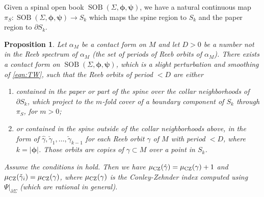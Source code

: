 \documentclass[11pt]{amsart}
\numberwithin{equation}{section}
\newtheorem{proposition}[theorem]{\textbf{Proposition}}
\def\CZ{\rm CZ}
\DeclareMathOperator{\SOB}{SOB}
\begin{document}
Given a spinal open book $\SOB(\Sigma,\bm{\phi},\bm{\psi})$, we have a natural continuous map $\pi_S:\SOB(\Sigma,\bm{\phi},\bm{\psi})\to S_k$ which maps the spine region to $S_k$ and the paper region to $\partial S_k$. 

\begin{proposition}\label{prop:CZ}
    Let $\alpha_M$ be a contact form on $M$ and let $D>0$ be a number not in the Reeb spectrum of $\alpha_M$ (the set of periods of Reeb orbits of $\alpha_M$). There exists a contact form on $\SOB(\Sigma,\bm{\phi},\bm{\psi})$, which is a slight perturbation and smoothing of \eqref{eqn:TW}, such that the Reeb orbits of period $<D$ are either
    \begin{enumerate}
        \item contained in the paper or part of the spine over the collar neighborhoods of $\partial S_k$, which project to the $m$-fold cover of a boundary component of $S_k$ through $\pi_S$, for $m>0$;
        \item or contained in the spine outside of the collar neighborhoods above, in the form of $\hat{\gamma},\check{\gamma}_1,\ldots,\check{\gamma}_{k-1}$ for each Reeb orbit $\gamma$ of $M$ with period $<D$, where $k=|\bm{\phi}|$. Those orbits are copies of $\gamma \subset M$ over a point in $S_k$.
    \end{enumerate}
    Assume the conditions in  hold. Then we have $\mu_{\CZ}(\hat{\gamma})=\mu_{\CZ}(\gamma)+1$ and $\mu_{\CZ}(\check{\gamma}_i)=\mu_{\CZ}(\gamma)$, where $\mu_{\CZ}(\gamma)$ is the Conley-Zehnder index computed using $\Psi|_{\partial \Sigma}$ (which are rational in general).
\end{proposition}
\end{document}
